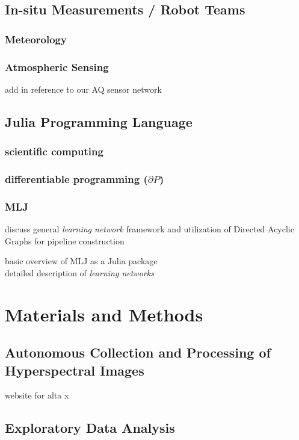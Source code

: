 \subsection{In-situ Measurements / Robot Teams}
\subsubsection{Meteorology}
\subsubsection{Atmospheric Sensing}
add in reference to our AQ sensor network

\subsection{Julia Programming Language}
\subsubsection{scientific computing}
\subsubsection{differentiable programming ($\partial P$)}
\subsubsection{MLJ}
discuss general \textit{learning network} framework and utilization of
Directed Acyclic Graphs for pipeline construction

basic overview of MLJ as a Julia package \cite{MLJ1}\\ 

detailed description of \textit{learning networks} \cite{MLJ2}



\section{Materials and Methods}
\subsection{Autonomous Collection and Processing of Hyperspectral Images}

website for alta x \cite{freeflyAltaX}


\subsection{Exploratory Data Analysis}
